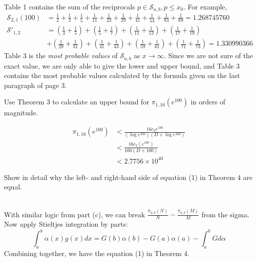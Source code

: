 \documentclass{article}
\begin{document}
\begin{solution}[Definition]\\
Table 1 contains the sum of the reciprocals $p\in\mathcal S_{a,b}, p\leq x_0$. For example, \begin{align*}
\mathcal S_{2,1}(100)&=\frac{1}{2}+\frac{1}{3}+\frac{1}{5}+\frac{1}{11}+\frac{1}{23}+\frac{1}{29}+\frac{1}{41}+\frac{1}{53}+\frac{1}{83}+\frac{1}{89}= 1.268745760\\
\mathcal S'_{1,2}&=\left(\frac{1}{3}+\frac{1}{5}\right)+\left(\frac{1}{5}+\frac{1}{7}\right)+\left(\frac{1}{11}+\frac{1}{13}\right)+\left(\frac{1}{17}+\frac{1}{19}\right)\\
&+\left(\frac{1}{29}+\frac{1}{31}\right)+\left(\frac{1}{41}+\frac{1}{43}\right)+\left(\frac{1}{59}+\frac{1}{61}\right)+\left(\frac{1}{71}+\frac{1}{73}\right)=1.330990366
\end{align*}
Table 3 is the \textit{most probable values} of $\mathcal S_{a,b}$ as $x\to\infty$. Since we are not sure of the exact value, we are only able to give the lower and upper bound, and Table 3 contains the most probable values calculated by the formula given on the last paragraph of page 3.
\end{solution}

\begin{custom-big}[Problem C.2 (e)]
Use Theorem 3 to calculate an upper bound for $\pi_{1,16}\left(e^{100}\right)$ in orders of magnitude.
\end{custom-big}

\begin{solution}
\begin{align*}
\pi_{1,16}(e^{100})&<\frac{16c_2e^{100}}{(\log e^{100})(D+\log e^{100})}\\
&<\frac{16c_2(e^{100})}{100(D+100)}\\
&<2.7756\times 10^{40}
\end{align*}
\end{solution}

\begin{custom-big}[Probelm C.2 (f)]
Show in detail why the left- and right-hand side of equation (1) in Theorem 4 are equal.
\end{custom-big}

\begin{solution}\\
With similar logic from part (c), we can break $\frac{\pi_{a,b}(N)}{N}-\frac{\pi_{a,b}(M)}{M}$ from the sigma. Now apply Stieltjes integration by parts:
\[\int_a^b\alpha(x)g(x)dx=G(b)\alpha(b)-G(a)\alpha(a)-\int^b_aGd\alpha\]
Combining together, we have the equation (1) in Theorem 4.
\end{solution}
\end{document}
